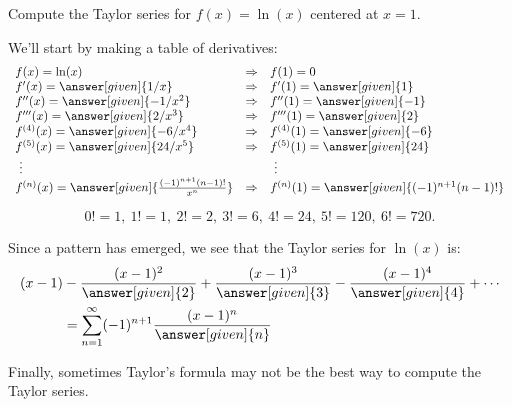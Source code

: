 \documentclass{ximera}
\begin{document}
\begin{example}
  Compute the Taylor series for $f(x) = \ln(x)$ centered at $x=1$.
  \begin{explanation}
    We'll start by making a table of derivatives:
    \[
    \begin{array}{lcl}
      f(x) = \ln(x) &\Rightarrow &f(1) = 0\\
      f'(x) = \answer[given]{1/x}&\Rightarrow &f'(1) = \answer[given]{1}\\
      f''(x) = \answer[given]{-1/x^2}&\Rightarrow &f''(1) = \answer[given]{-1}\\
      f'''(x) = \answer[given]{2/x^3}&\Rightarrow &f'''(1) = \answer[given]{2}\\
      f^{(4)}(x) = \answer[given]{-6/x^4}&\Rightarrow &f^{(4)}(1) = \answer[given]{-6}\\
      f^{(5)}(x) = \answer[given]{24/x^5}&\Rightarrow &f^{(5)}(1) = \answer[given]{24}\\
      \ \vdots & &\ \vdots\\
      f^{(n)}(x) = \answer[given]{\frac{(-1)^{n+1}(n-1)!}{x^n}} &\Rightarrow & f^{(n)}(1) = \answer[given]{(-1)^{n+1}(n-1)!}
    \end{array}
    \]
    \begin{hint}
      \[
      0! = 1,\ 1! = 1,\ 2!=2,\ 3! = 6,\ 4! = 24, \ 5!=120, \ 6! = 720.
      \]
    \end{hint}
    Since a pattern has emerged, we see that the Taylor series for
    $\ln(x)$ is:
    \begin{align*}
    (x-1) &- \frac{(x-1)^2}{\answer[given]{2}} + \frac{(x-1)^3}{\answer[given]{3}} - \frac{(x-1)^4}{\answer[given]{4}} + \cdots \\
    &= \sum_{n=1}^\infty (-1)^{n+1}\frac{(x-1)^n}{\answer[given]{n}}
    \end{align*}
  \end{explanation}
\end{example}

Finally, sometimes Taylor's formula may not be the best way to compute the
Taylor series.
\end{document}
